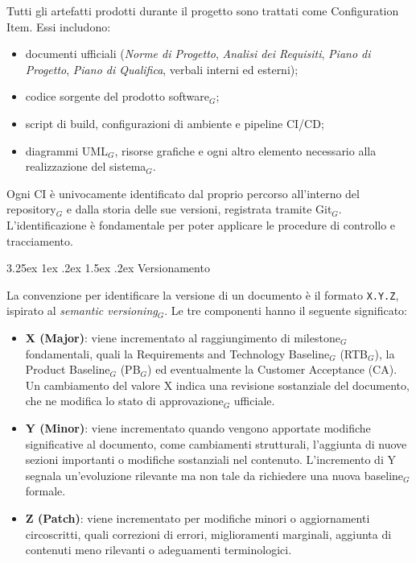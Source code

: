 \documentclass[a4paper, 10pt]{article}
\makeatletter
\renewcommand\paragraph{\@startsection{paragraph}{4}{\z@}%
  {3.25ex \@plus1ex \@minus .2ex}%
  {1.5ex \@plus .2ex}%
  {\normalfont\normalsize\bfseries}}
\makeatother
\begin{document}
Tutti gli artefatti prodotti durante il progetto sono trattati come Configuration Item. Essi includono:
\begin{itemize}
    \item documenti ufficiali (\emph{Norme di Progetto}, \emph{Analisi dei Requisiti}, \emph{Piano di Progetto}, \emph{Piano di Qualifica}, verbali interni ed esterni);
    \item codice sorgente del prodotto software$_G$;
    \item script di build, configurazioni di ambiente e pipeline CI/CD;
    \item diagrammi UML$_G$, risorse grafiche e ogni altro elemento necessario alla realizzazione del sistema$_G$.
\end{itemize}

Ogni CI è univocamente identificato dal proprio percorso all'interno del repository$_G$ e dalla storia delle sue versioni, registrata tramite Git$_G$. L'identificazione è fondamentale per poter applicare le procedure di controllo e tracciamento.

\paragraph{Versionamento}

La convenzione per identificare la versione di un documento è il formato \texttt{X.Y.Z}, ispirato al \emph{semantic versioning}$_G$. Le tre componenti hanno il seguente significato:
\begin{itemize}
    \item \textbf{X (Major)}: viene incrementato al raggiungimento di milestone$_G$ fondamentali, quali la Requirements and Technology Baseline$_G$ (RTB$_G$), la Product Baseline$_G$ (PB$_G$) ed eventualmente la Customer Acceptance (CA). Un cambiamento del valore X indica una revisione sostanziale del documento, che ne modifica lo stato di approvazione$_G$ ufficiale.
    \item \textbf{Y (Minor)}: viene incrementato quando vengono apportate modifiche significative al documento, come cambiamenti strutturali, l'aggiunta di nuove sezioni importanti o modifiche sostanziali nel contenuto. L'incremento di Y segnala un'evoluzione rilevante ma non tale da richiedere una nuova baseline$_G$ formale.
    \item \textbf{Z (Patch)}: viene incrementato per modifiche minori o aggiornamenti circoscritti, quali correzioni di errori, miglioramenti marginali, aggiunta di contenuti meno rilevanti o adeguamenti terminologici.
\end{itemize}
\end{document}
